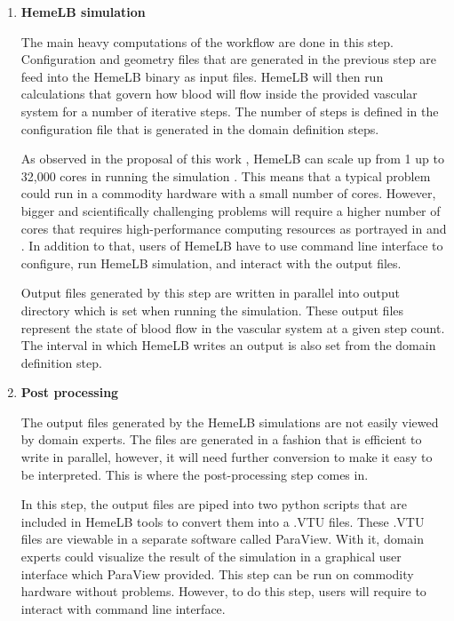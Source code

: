 \begin{enumerate}
\item{\textbf{HemeLB simulation}}

The main heavy computations of the workflow are done in this step.  Configuration and geometry files that are generated in the previous step are feed into the HemeLB binary as input files. HemeLB will then run calculations that govern how blood will flow inside the provided vascular system for a number of iterative steps. The number of steps is defined in the configuration file that is generated in the domain definition steps. 

As observed in the proposal of this work \citep{Steven:2016aa}, HemeLB can scale up from 1 up to 32,000 cores in running the simulation \citep{groen2013analysing}. This means that a typical problem could run in a commodity hardware with a small number of cores. However, bigger and scientifically challenging problems will require a higher number of cores that requires high-performance computing resources as portrayed in \cite{franco2016non, franco2015dynamic} and \cite{bernabeu2015characterization}. In addition to that, users of HemeLB have to use command line interface to configure, run HemeLB simulation, and interact with the output files. 

Output files generated by this step are written in parallel into output directory which is set when running the simulation. These output files represent the state of blood flow in the vascular system at a given step count. The interval in which HemeLB writes an output is also set from the domain definition step.

\item{\textbf{Post processing}}

The output files generated by the HemeLB simulations are not easily viewed by domain experts. The files are generated in a fashion that is efficient to write in parallel, however, it will need further conversion to make it easy to be interpreted. This is where the post-processing step comes in.  

In this step, the output files are piped into two python scripts that are included in HemeLB tools to convert them into a .VTU files. These .VTU files are viewable in a separate software called ParaView. With it, domain experts could visualize the result of the simulation in a graphical user interface which ParaView provided. This step can be run on commodity hardware without problems. However, to do this step, users will require to interact with command line interface.

\end{enumerate}

